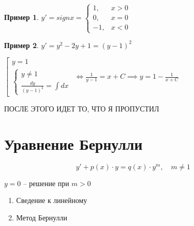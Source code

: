 \documentclass{report}
\theoremstyle{definition}
\newtheorem{example}{Пример}
\begin{document}
\begin{example}
    $y'=sign x = \left\{\begin{array}{rl}
            1,  & x > 0 \\
            0,  & x = 0 \\
            -1, & x < 0
        \end{array}\right.$
\end{example}

\begin{example}
    $y' = y^2 - 2y + 1 = (y-1)^2$

    $\left[\begin{array}{l}
            y = 1 \\
            \left\{\begin{array}{l}
                       y \ne 1 \\
                       \frac{dy}{(y - 1)^2} = \int dx
                   \end{array}\right.
        \end{array}\right. \iff \frac{1}{y-1} = x + C \implies y = 1 - \frac{1}{x + C}$
\end{example}

\begin{center}
    {\Large ПОСЛЕ ЭТОГО ИДЕТ ТО, ЧТО Я ПРОПУСТИЛ}
\end{center}

\section{Уравнение Бернулли}

\begin{equation*}
    y'+p(x) \cdot y = q(x)\cdot y^m, \quad m\ne 1
\end{equation*}

\begin{center}
    $y=0$ -- решение при $m > 0$
\end{center}

\begin{enumerate}
    \item Сведение к линейному
    \item Метод Бернулли
\end{enumerate}
\end{document}
